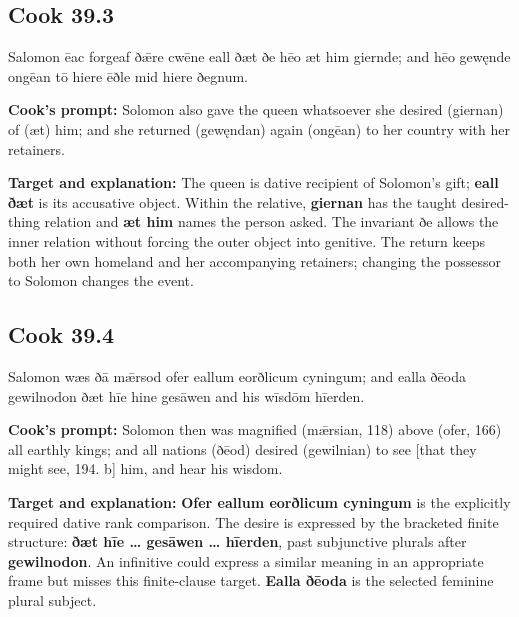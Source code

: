 \par\begin{minipage}{\linewidth}\raggedright
\subsection*{Cook 39.3}

Salomon ēac forgeaf ðǣre cwēne eall ðæt ðe hēo æt him giernde; and hēo gewęnde ongēan tō hiere ēðle mid hiere ðegnum.

\textbf{Cook's prompt:} Solomon also gave the queen whatsoever she desired (giernan) of (æt) him; and she returned (gewęndan) again (ongēan) to her country with her retainers.

\textbf{Target and explanation:} The queen is dative recipient of Solomon's gift; \textbf{eall ðæt} is its accusative object. Within the relative, \textbf{giernan} has the taught desired-thing relation and \textbf{æt him} names the person asked. The invariant ðe allows the inner relation without forcing the outer object into genitive. The return keeps both her own homeland and her accompanying retainers; changing the possessor to Solomon changes the event.

\end{minipage}\par\addvspace{4pt}

\par\begin{minipage}{\linewidth}\raggedright
\subsection*{Cook 39.4}

Salomon wæs ðā mǣrsod ofer eallum eorðlicum cyningum; and ealla ðēoda gewilnodon ðæt hīe hine gesāwen and his wīsdōm hīerden.

\textbf{Cook's prompt:} Solomon then was magnified (mǣrsian, 118) above (ofer, 166) all earthly kings; and all nations (ðēod) desired (gewilnian) to see [that they might see, 194. b] him, and hear his wisdom.

\textbf{Target and explanation:} \textbf{Ofer eallum eorðlicum cyningum} is the explicitly required dative rank comparison. The desire is expressed by the bracketed finite structure: \textbf{ðæt hīe … gesāwen … hīerden}, past subjunctive plurals after \textbf{gewilnodon}. An infinitive could express a similar meaning in an appropriate frame but misses this finite-clause target. \textbf{Ealla ðēoda} is the selected feminine plural subject.

\end{minipage}\par\addvspace{4pt}

